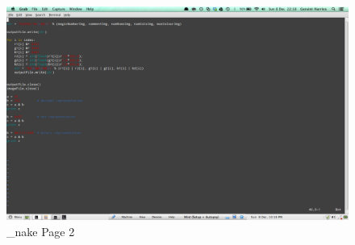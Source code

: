 \documentclass[12pt]{article}
\begin{document}
				\begin{figure}[ht!]
					\centering
					\includegraphics[width=12cm]{Images/_nape2.png}
					\caption{\_nake Page 2}
				\end{figure}
				
\end{document}
